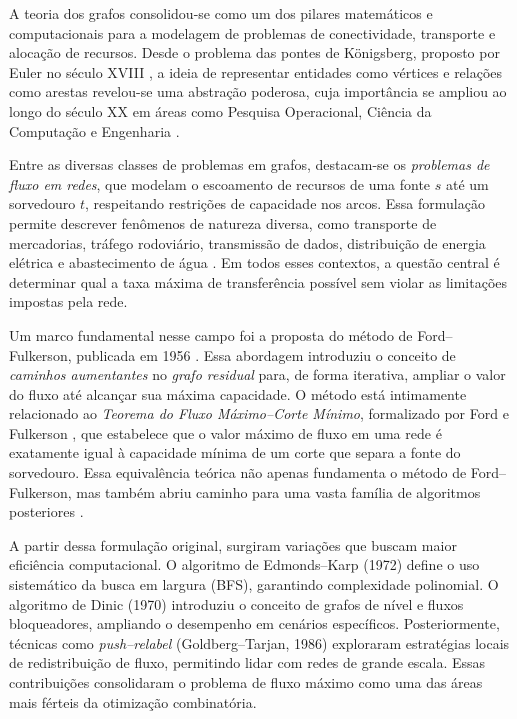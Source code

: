 \documentclass[12pt]{article}
\begin{document}
A teoria dos grafos consolidou-se como um dos pilares matemáticos e computacionais para a modelagem de problemas de conectividade, transporte e alocação de recursos. Desde o problema das pontes de Königsberg, proposto por Euler no século XVIII \cite{euler1736}, a ideia de representar entidades como vértices e relações como arestas revelou-se uma abstração poderosa, cuja importância se ampliou ao longo do século XX em áreas como Pesquisa Operacional, Ciência da Computação e Engenharia \cite{bondy1976,west2001}.

\noindent Entre as diversas classes de problemas em grafos, destacam-se os \emph{problemas de fluxo em redes}, que modelam o escoamento de recursos de uma fonte $s$ até um sorvedouro $t$, respeitando restrições de capacidade nos arcos. Essa formulação permite descrever fenômenos de natureza diversa, como transporte de mercadorias, tráfego rodoviário, transmissão de dados, distribuição de energia elétrica e abastecimento de água \cite{ahuja1993,ahuja1990}. Em todos esses contextos, a questão central é determinar qual a taxa máxima de transferência possível sem violar as limitações impostas pela rede.

\noindent Um marco fundamental nesse campo foi a proposta do método de Ford–Fulkerson, publicada em 1956 \cite{ford1956}. Essa abordagem introduziu o conceito de \emph{caminhos aumentantes} no \emph{grafo residual} para, de forma iterativa, ampliar o valor do fluxo até alcançar sua máxima capacidade. O método está intimamente relacionado ao \emph{Teorema do Fluxo Máximo–Corte Mínimo}, formalizado por Ford e Fulkerson \cite{ford1956}, que estabelece que o valor máximo de fluxo em uma rede é exatamente igual à capacidade mínima de um corte que separa a fonte do sorvedouro. Essa equivalência teórica não apenas fundamenta o método de Ford–Fulkerson, mas também abriu caminho para uma vasta família de algoritmos posteriores \cite{cormen2009}.

\noindent A partir dessa formulação original, surgiram variações que buscam maior eficiência computacional. O algoritmo de Edmonds–Karp (1972) \cite{edmonds1972} define o uso sistemático da busca em largura (BFS), garantindo complexidade polinomial. O algoritmo de Dinic (1970) \cite{dinic1970} introduziu o conceito de grafos de nível e fluxos bloqueadores, ampliando o desempenho em cenários específicos. Posteriormente, técnicas como \emph{push–relabel} (Goldberg–Tarjan, 1986) \cite{goldberg1988} exploraram estratégias locais de redistribuição de fluxo, permitindo lidar com redes de grande escala. Essas contribuições consolidaram o problema de fluxo máximo como uma das áreas mais férteis da otimização combinatória.
\end{document}
